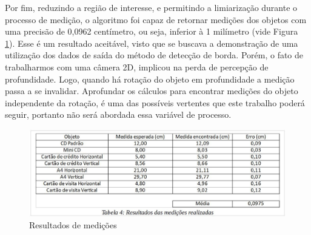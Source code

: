 \documentclass[a4paper,alpha-refs]{RBCA_v1.0}
\begin{document}
Por fim, reduzindo a região de interesse, e permitindo a limiarização durante o processo de medição, o algoritmo foi capaz de retornar medições dos objetos com uma precisão de 0,0962 centímetro, ou seja, inferior à 1 milímetro (vide Figura \ref{img:tabela3}). Esse é um resultado aceitável, visto que se buscava a demonstração de uma utilização dos dados de saída do método de detecção de borda. Porém, o fato de trabalharmos com uma câmera 2D, implicou na perda de percepção de profundidade. Logo, quando há rotação do objeto em profundidade a medição passa a se invalidar. Aprofundar os cálculos para encontrar medições do objeto independente da rotação, é uma das possíveis vertentes que este trabalho poderá seguir, portanto não será abordada essa variável de processo.

\begin{figure}[h!]
	\centering
	\includegraphics[width=.5\textwidth]{img/T4.JPG}
	\caption{Resultados de medições}
	\label{img:tabela3}
\end{figure}

 
\end{document}
